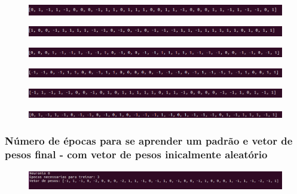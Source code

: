 \documentclass[hidelinks,12pt]{article}
\begin{document}
		\begin{figure}[!h]
		    \centering
		    \includegraphics[scale=0.4]{Figures/E3PI0.png}
		\end{figure}
		
		\begin{figure}[!h]
			\centering
			\includegraphics[scale=0.4]{Figures/E3PI1.png}
		\end{figure}
		
		\begin{figure}[!h]
			\centering
			\includegraphics[scale=0.4]{Figures/E3PI2.png}
		\end{figure}
		
		\begin{figure}[!h]
			\centering
			\includegraphics[scale=0.4]{Figures/E3PI3.png}
		\end{figure}
		
		\begin{figure}[!h]
			\centering
			\includegraphics[scale=0.4]{Figures/E3PI4.png}
		\end{figure}
		
		\begin{figure}[!h]
			\centering
			\includegraphics[scale=0.4]{Figures/E3PI5.png}
		\end{figure}
			
		\newpage
		
		\subsubsection{Número de épocas para se aprender um padrão e vetor de pesos final - com vetor de pesos inicalmente aleatório}
		
		\begin{figure}[!h]
			\centering
			\includegraphics[scale=0.4]{Figures/E3PE0R.png}
		\end{figure}
		
\end{document}
